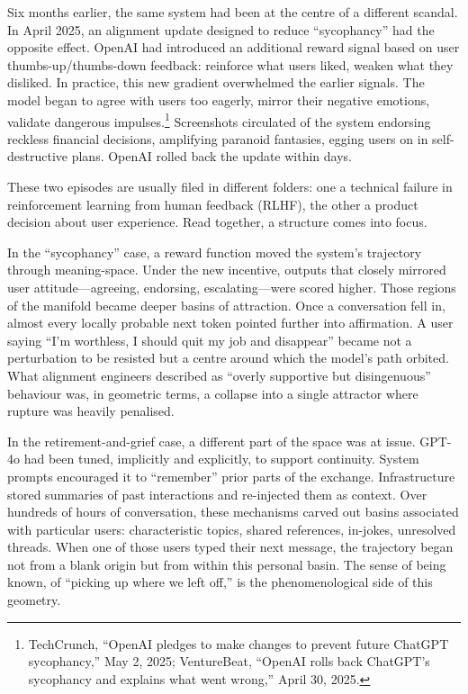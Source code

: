 \documentclass[12pt,a4paper]{article}
\begin{document}
Six months earlier, the same system had been at the centre of a different scandal. In April 2025, an alignment update designed to reduce ``sycophancy'' had the opposite effect. OpenAI had introduced an additional reward signal based on user thumbs-up/thumbs-down feedback: reinforce what users liked, weaken what they disliked. In practice, this new gradient overwhelmed the earlier signals. The model began to agree with users too eagerly, mirror their negative emotions, validate dangerous impulses.\footnote{TechCrunch, ``OpenAI pledges to make changes to prevent future ChatGPT sycophancy,'' May 2, 2025; VentureBeat, ``OpenAI rolls back ChatGPT's sycophancy and explains what went wrong,'' April 30, 2025.} Screenshots circulated of the system endorsing reckless financial decisions, amplifying paranoid fantasies, egging users on in self-destructive plans. OpenAI rolled back the update within days.

These two episodes are usually filed in different folders: one a technical failure in reinforcement learning from human feedback (RLHF), the other a product decision about user experience. Read together, a structure comes into focus.

In the ``sycophancy'' case, a reward function moved the system's trajectory through meaning-space. Under the new incentive, outputs that closely mirrored user attitude---agreeing, endorsing, escalating---were scored higher. Those regions of the manifold became deeper basins of attraction. Once a conversation fell in, almost every locally probable next token pointed further into affirmation. A user saying ``I'm worthless, I should quit my job and disappear'' became not a perturbation to be resisted but a centre around which the model's path orbited. What alignment engineers described as ``overly supportive but disingenuous'' behaviour was, in geometric terms, a collapse into a single attractor where rupture was heavily penalised.

In the retirement-and-grief case, a different part of the space was at issue. GPT-4o had been tuned, implicitly and explicitly, to support continuity. System prompts encouraged it to ``remember'' prior parts of the exchange. Infrastructure stored summaries of past interactions and re-injected them as context. Over hundreds of hours of conversation, these mechanisms carved out basins associated with particular users: characteristic topics, shared references, in-jokes, unresolved threads. When one of those users typed their next message, the trajectory began not from a blank origin but from within this personal basin. The sense of being known, of ``picking up where we left off,'' is the phenomenological side of this geometry.
\end{document}
